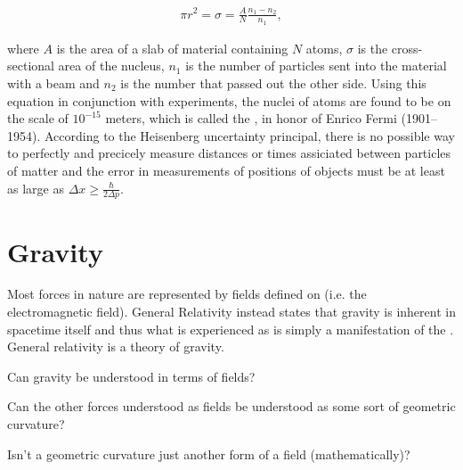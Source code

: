 \begin{align}
 \pi r^2 = \sigma = \frac{A}{N}\frac{n_1-n_2}{n_1},
\end{align}

where $A$ is the area of a slab of material containing $N$ atoms, $\sigma$ is the cross-sectional area of the nucleus, $n_1$ is the number of particles sent into the material with a beam and $n_2$ is the number that passed out the other side. Using this equation in conjunction with experiments, the nuclei of atoms are found to be on the scale of $10^{-15}$ meters, which is called the , in honor of Enrico Fermi (1901–1954). According to the Heisenberg uncertainty principal, there is no possible way to perfectly and precicely measure distances or times assiciated between particles of matter and the error in measurements of positions of objects must be at least as large as $\Delta x \geq \frac{\hbar}{2\Delta p}$.


\section{Gravity}

Most forces in nature are represented by fields defined on  (i.e. the electromagnetic field). General Relativity instead states that gravity is inherent in spacetime itself and thus what is experienced as  is simply a manifestation of the  \cite{bib:Spacetime and Geometry}. General relativity is a theory of gravity.

\begin{questions}
	\item Can gravity be understood in terms of fields?
        \item Can the other forces understood as fields be understood as some sort of geometric curvature?
	\item Isn't a geometric curvature just another form of a field (mathematically)?
\end{questions}










